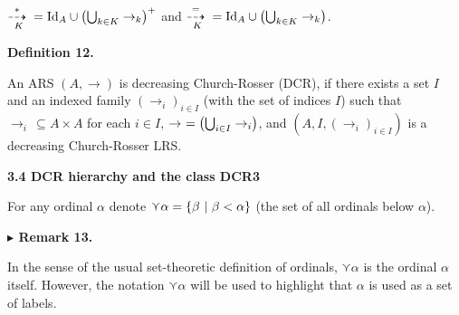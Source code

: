  
 
${\mathop{\buildrel*\over{\dashrightarrow}\;}\limits_{K}}=\mathrm{Id}_{A}\cup%
\left(\bigcup_{k\in K}\to_{k}\right)^{+}$ and ${\mathop{\buildrel=\over{\dashrightarrow}\;}\limits_{K}}=\mathrm{Id}_{A}\cup%
\left(\bigcup_{k\in K}\to_{k}\right)$.\par
 
 
  
 
 
 
\par\medskip\noindent\textbf{Definition 12.}\par
 
 
An ARS $(A,\to)$ is decreasing Church-Rosser (DCR), if there exists a set $I$ and an indexed family $(\to_{i})_{i\in I}$ (with the set of indices $I$) such that $\to_{i}\,\subseteq A\times A$ for each $i\in I$, $\to\leavevmode\nobreak\ =\left(\bigcup_{i\in I}\to_{i}\right)$, and $(A,I,(\to_{i})_{i\in I})$ is a decreasing Church-Rosser LRS.\par
 
 
 
 
 
\par\medskip\noindent\textbf{3.4 DCR hierarchy and the class DCR3}\par
 
 
For any ordinal $\alpha$ denote $\curlyvee\alpha=\{\beta\leavevmode\nobreak\ |\leavevmode\nobreak\ \beta<\alpha\}$ (the set of all ordinals below $\alpha$).\par
 
 
 
\par\medskip\noindent\textbf{$\blacktriangleright$ Remark 13.}\par
 
 
In the sense of the usual set-theoretic definition of ordinals, $\curlyvee\alpha$ is the ordinal $\alpha$ itself. However, the notation $\curlyvee\alpha$ will be used to highlight that $\alpha$ is used as a set of labels.\par
 
